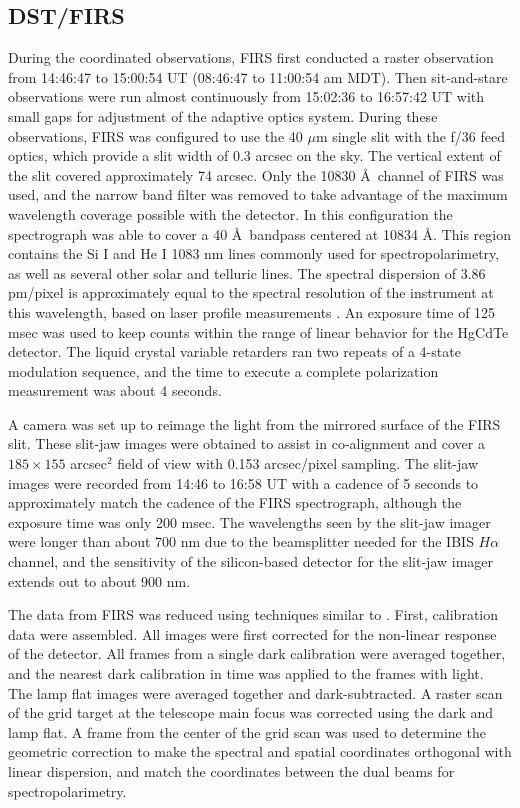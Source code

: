 \documentclass[twocolumn]{aastex62}
\newcommand{\halpha}{\ensuremath{H\alpha}}
\begin{document}
\subsection{DST/FIRS}
During the coordinated observations, FIRS first conducted a raster observation from 14:46:47 to 15:00:54 UT (08:46:47 to 11:00:54 am MDT).  Then sit-and-stare observations were run almost continuously from 15:02:36 to 16:57:42 UT with small gaps for adjustment of the adaptive optics system.  During these observations, FIRS was configured to use the 40 $\mu$m single slit with the f/36 feed optics, which provide a slit width of 0.3 arcsec on the sky.  The vertical extent of the slit covered approximately 74 arcsec.  Only the 10830 \AA\ channel of FIRS was used, and the narrow band filter was removed to take advantage of the maximum wavelength coverage possible with the detector.  In this configuration the spectrograph was able to cover a 40 \AA\ bandpass centered at 10834 \AA.  This region contains the Si I and He I 1083 nm lines commonly used for spectropolarimetry, as well as several other solar and telluric lines.  The spectral dispersion of 3.86 pm/pixel is approximately equal to the spectral resolution of the instrument at this wavelength, based on laser profile measurements \citep{2011Jaeggli_PHD}.  An exposure time of 125 msec was used to keep counts within the range of linear behavior for the HgCdTe detector.  The liquid crystal variable retarders ran two repeats of a 4-state modulation sequence, and the time to execute a complete polarization measurement was about 4 seconds.

A camera was set up to reimage the light from the mirrored surface of the FIRS slit.  These slit-jaw images were obtained to assist in co-alignment and cover a $185\times155$ arcsec$^2$ field of view with 0.153 arcsec/pixel sampling.  The slit-jaw images were recorded from 14:46 to 16:58 UT with a cadence of 5 seconds to approximately match the cadence of the FIRS spectrograph, although the exposure time was only 200 msec.  The wavelengths seen by the slit-jaw imager  were longer than about 700 nm due to the beamsplitter needed for the IBIS \halpha{} channel, and the sensitivity of the silicon-based detector for the slit-jaw imager extends out to about 900 nm.

The data from FIRS was reduced using techniques similar to \citet{2012Jaegglietal}.  First, calibration data were assembled.  All images were first corrected for the non-linear response of the detector.  All frames from a single dark calibration were averaged together, and the nearest dark calibration in time was applied to the frames with light.  The lamp flat images were averaged together and dark-subtracted.  A raster scan of the grid target at the telescope main focus was corrected using the dark and lamp flat.  A frame from the center of the grid scan was used to determine the geometric correction to make the spectral and spatial coordinates orthogonal with linear dispersion, and match the coordinates between the dual beams for spectropolarimetry.
\end{document}
